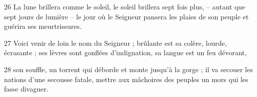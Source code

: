 
26 La lune brillera comme le soleil, le soleil brillera sept fois plus, – autant que sept jours de lumière – le jour où le Seigneur pansera les plaies de son peuple et guérira ses meurtrissures.

27 Voici venir de loin le nom du Seigneur ; brûlante est sa colère, lourde, écrasante ; ses lèvres sont gonflées d’indignation, sa langue est un feu dévorant,

28 son souffle, un torrent qui déborde et monte jusqu’à la gorge ; il va secouer les nations d’une secousse fatale, mettre aux mâchoires des peuples un mors qui les fasse divaguer.
